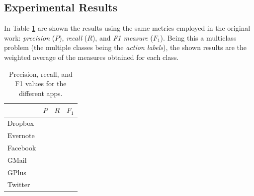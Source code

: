 \subsection{Experimental Results}
In Table \ref{tab:results} are shown the results using the same metrics employed in the original work: \textit{precision} ($P$), \textit{recall} ($R$), and \textit{F1 measure} ($F_1$). Being this a multiclass problem (the multiple classes being the \textit{action labels}), the shown results are the weighted average of the measures obtained for each class.


\begin{table}[h]
\centering
\begin{tabular}{l|ccc}
\hline
         & $P$ & $R$ & $F_1$ \\ \hline
Dropbox  &     &     &       \\
Evernote &     &     &       \\
Facebook &     &     &       \\
GMail    &     &     &       \\
GPlus    &     &     &       \\
Twitter  &     &     &       \\ \hline
\end{tabular}
\caption{Precision, recall, and F1 values for the different apps.}
\label{tab:results}
\end{table}


